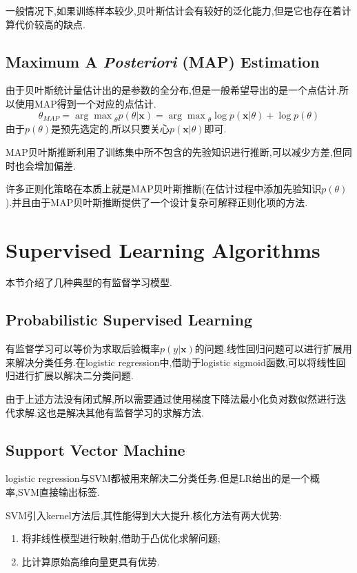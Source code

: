 一般情况下,如果训练样本较少,贝叶斯估计会有较好的泛化能力,但是它也存在着计算代价较高的缺点.

\subsection{Maximum A \textit{Posteriori} (MAP) Estimation}

由于贝叶斯统计量估计出的是参数的全分布,但是一般希望导出的是一个点估计.所以使用MAP得到一个对应的点估计.
\begin{equation}
\theta_{MAP}={\arg\max}_\theta p(\theta|\mathbf x)={\arg\max}_\theta\log p(\mathbf x|\theta)+\log p(\theta)
\end{equation}
由于$p(\theta)$是预先选定的,所以只要关心$p(\mathbf x|\theta)$即可.

MAP贝叶斯推断利用了训练集中所不包含的先验知识进行推断,可以减少方差,但同时也会增加偏差.

许多正则化策略在本质上就是MAP贝叶斯推断(在估计过程中添加先验知识$p(\theta)$).并且由于MAP贝叶斯推断提供了一个设计复杂可解释正则化项的方法.

\section{Supervised Learning Algorithms}

本节介绍了几种典型的有监督学习模型.

\subsection{Probabilistic Supervised Learning}

有监督学习可以等价为求取后验概率$p(y|\mathbf x)$的问题.线性回归问题可以进行扩展用来解决分类任务.在logistic regression中,借助于logistic sigmoid函数,可以将线性回归进行扩展以解决二分类问题.

由于上述方法没有闭式解,所以需要通过使用梯度下降法最小化负对数似然进行迭代求解.这也是解决其他有监督学习的求解方法.

\subsection{Support Vector Machine}

logistic regression与SVM都被用来解决二分类任务.但是LR给出的是一个概率,SVM直接输出标签.

SVM引入kernel方法后,其性能得到大大提升.核化方法有两大优势:
\begin{enumerate}
\item 将非线性模型进行映射,借助于凸优化求解问题;
\item 比计算原始高维向量更具有优势.
\end{enumerate}

